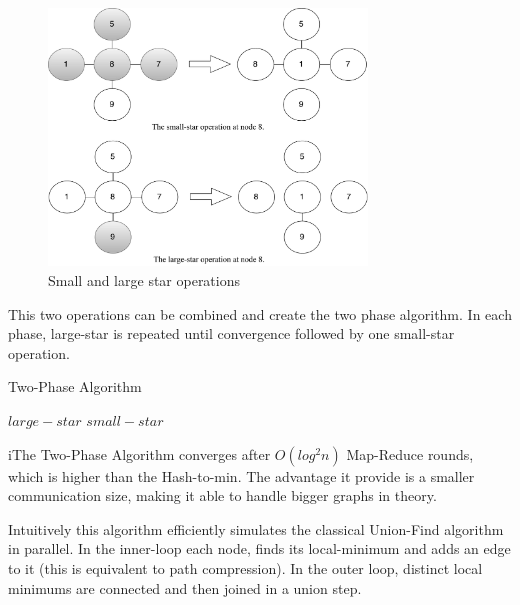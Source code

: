 \begin{figure}[ht]
  \centering
    \includegraphics[width=20pc]{figures/two_phase}
  \caption{Small and large star operations}
  \label{fig:smalllargestar}
\end{figure}

This two operations can be combined and create the two phase algorithm. In each phase, large-star is repeated until convergence followed by one small-star operation.

\begin{algorithm}[!h]
        \caption{Two-Phase Algorithm}
        \label{algo:two_phase}
        \begin{algorithmic}[1]
                        \Repeat
                                \Repeat
                                        \State $large-star$
                        \State $small-star$
                \EndFunction
        \end{algorithmic}
\end{algorithm}

iThe Two-Phase Algorithm converges after $O(log^2 n)$ Map-Reduce rounds, which is higher than the Hash-to-min. The advantage it provide is a smaller communication size, making it able to handle bigger graphs in theory.

Intuitively this algorithm efficiently simulates the classical Union-Find algorithm in parallel. In the inner-loop each node, finds its local-minimum and adds an edge to it (this is equivalent to path compression). In the outer loop, distinct local minimums are connected and then joined in a union step. \cite{kiveris}
